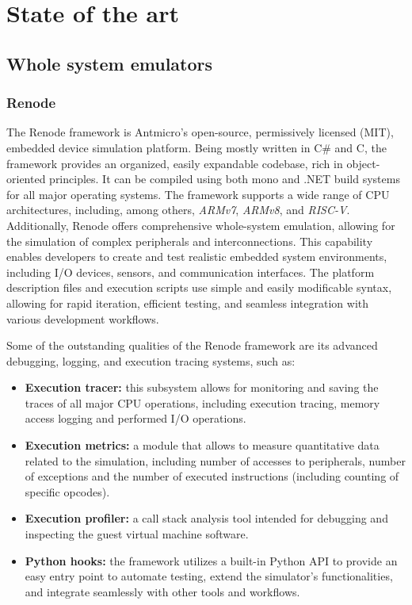 
\chapter{State of the art} %

\section{Whole system emulators}

\subsection{Renode}

The Renode framework is Antmicro’s open-source, permissively licensed (MIT), embedded device simulation platform. Being mostly written in C\# and C, the framework provides an organized,
easily expandable codebase, rich in object-oriented principles. It can be compiled using both mono and .NET build systems for all major operating systems.
The framework supports a wide range of CPU architectures, including, among others, \textit{ARMv7}, \textit{ARMv8}, and \textit{RISC-V}.
Additionally, Renode offers comprehensive whole-system emulation, allowing for the simulation of complex peripherals and interconnections. This capability enables developers to
create and test realistic embedded system environments, including I/O devices, sensors, and communication interfaces. The platform description files and execution scripts
use simple and easily modificable syntax, allowing for rapid iteration, efficient testing, and seamless integration with various development workflows.

Some of the outstanding qualities of the Renode framework are its advanced debugging, logging, and execution tracing systems, such as:
\begin{itemize}
	\item \textbf{Execution tracer:} this subsystem allows for monitoring and saving the traces of all major CPU operations, including execution tracing, memory access logging and
		performed I/O operations.
	\item \textbf{Execution metrics:} a module that allows to measure quantitative data related to the simulation, including number of accesses to peripherals, number of exceptions and
		the number of executed instructions (including counting of specific opcodes).
	\item \textbf{Execution profiler:} a call stack analysis tool intended for debugging and inspecting the guest virtual machine software.
	\item \textbf{Python hooks:} the framework utilizes a built-in Python API to provide an easy entry point to automate testing, extend the simulator's functionalities, and integrate
		seamlessly with other tools and workflows.
\end{itemize}

